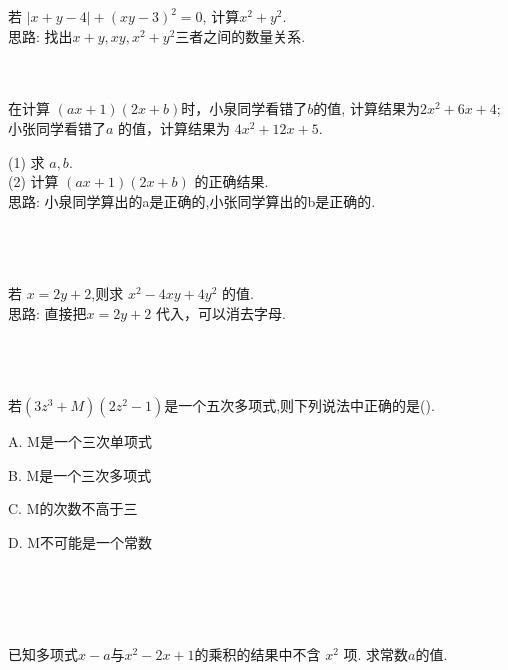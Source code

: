 \item {
    若 $\lvert x+y-4 \rvert + (xy-3)^2 = 0$, 计算$x^2 + y^2$.
    \ifshowSolution
        \fangsong{}
        \\
        思路: 找出$x+y, xy, x^2+y^2$三者之间的数量关系.
    \else
        \\ \\ \\
    \fi
}

\item {
    在计算 $(ax+1)(2x+b)$时，小泉同学看错了$b$的值, 计算结果为$2x^2 + 6x + 4$; 小张同学看错了$a$ 的值，计算结果为 $4x^2+12x+5$.

    (1) 求 $a,b$.\\
    (2) 计算 $(ax+1)(2x+b)$ 的正确结果.
    \ifshowSolution
        \fangsong{}
        \\
        思路: 小泉同学算出的a是正确的,小张同学算出的b是正确的.
    \else
        \\ \\ \\ \\ 
    \fi
}

\item {
    若 $x=2y+2$,则求 $x^2 - 4xy + 4y^2$ 的值.
    \ifshowSolution
        \fangsong{}
        \\
        思路: 直接把$x=2y+2$ 代入，可以消去字母.
    \else
        \\ \\ \\ \\ 
    \fi
}

\item {
    若$(3z^3 + M)(2z^2 - 1)$是一个五次多项式,则下列说法中正确的是(\quad).

    A. M是一个三次单项式

    B. M是一个三次多项式

    C. M的次数不高于三

    D. M不可能是一个常数
    \ifshowSolution
        \fangsong{}
        \\
    \else
        \\ \\ \\ \\ 
    \fi
}

\item {
    已知多项式$x-a$与$x^2 - 2x + 1$的乘积的结果中不含 $x^2$ 项. 求常数$a$的值.
    \ifshowSolution
        \fangsong{}
        \\
    \else
        \\ \\ \\ \\ 
    \fi
}

